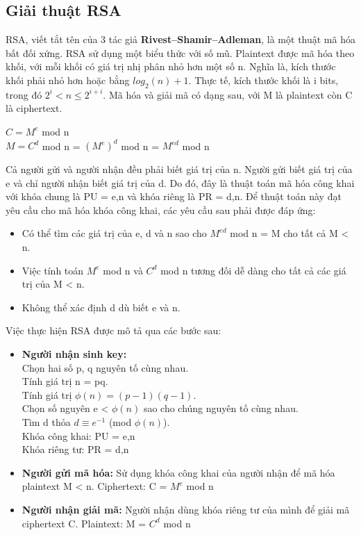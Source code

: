 \documentclass[a4paper]{article}
\begin{document}
\subsection{Giải thuật RSA}
RSA, viết tắt tên của 3 tác giả \textbf{Rivest–Shamir–Adleman}, là một thuật mã hóa bất đối xứng. RSA sử dụng một biểu thức với số mũ. Plaintext được mã hóa theo khối, với mỗi khối có giá trị nhị phân nhỏ hơn một số n. Nghĩa là, kích thước khối phải nhỏ hơn hoặc bằng $log_2(n)+ 1$. Thực tế, kích thước khối là i bits, trong đó $2^i<n\leq2^{i+i}$. Mã hóa và giải mã có dạng sau, với M là plaintext còn C là ciphertext.
\begin{center}
    $C = M^e$ mod n
    \\$M = C^d$ mod n = $(M^e)^d$ mod n = $M^{ed}$ mod n
\end{center}{}
Cả người gửi và người nhận đều phải biết giá trị của n. Người gửi biết giá trị của e và chỉ người nhận biết giá trị của d. Do đó, đây là thuật toán mã hóa công khai với khóa chung là PU = {e,n} và khóa riêng là PR = {d,n}. Để thuật toán này đạt yêu cầu cho mã hóa khóa công khai, các yêu cầu sau phải được đáp ứng:
\begin{itemize}
    \item Có thể tìm các giá trị của e, d và n sao cho $M^{ed}$ mod n = M cho tất cả M < n.
    \item Việc tính toán $M^e$ mod n và $C^d$ mod n tương đối dễ dàng cho tất cả các giá trị của M < n.
    \item Không thể xác định d dù biết e và n.
\end{itemize}
Việc thực hiện RSA được mô tả qua các bước sau:
\begin{itemize}
    \item \textbf{Người nhận sinh key:}
    \\Chọn hai số p, q nguyên tố cùng nhau.
    \\Tính giá trị n = pq.
    \\Tính giá trị $\phi(n) = (p-1)(q-1)$.
    \\Chọn số nguyên e < $\phi(n)$ sao cho chúng nguyên tố cùng nhau.
    \\Tìm d thỏa $d \equiv e^{-1}$ (mod $\phi(n)$).
    \\Khóa công khai: PU = {e,n}
    \\Khóa riêng tư:  PR = {d,n}
    \item \textbf{Người gửi mã hóa:}
    Sử dụng khóa công khai của người nhận để mã hóa plaintext M < n.
    Ciphertext: C = $M^e$ mod n
    \item \textbf{Người nhận giải mã:}
    Người nhận dùng khóa riêng tư của mình để giải mã ciphertext C.
    Plaintext: M = $C^d$ mod n
\end{itemize}
\end{document}
